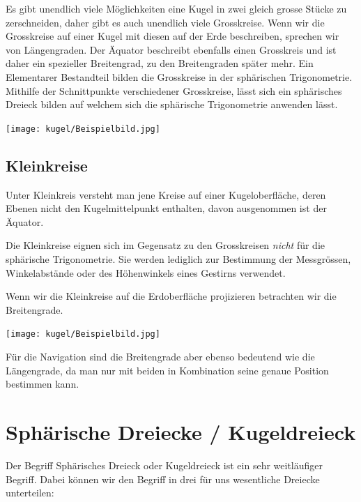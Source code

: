 \begin{refsection}
Es gibt unendlich viele Möglichkeiten eine Kugel in zwei gleich grosse Stücke zu zerschneiden, 
daher gibt es auch unendlich viele Grosskreise. Wenn wir die Grosskreise auf einer Kugel mit diesen auf der Erde beschreiben, sprechen wir von Längengraden. Der Äquator beschreibt ebenfalls einen Grosskreis und ist daher ein spezieller Breitengrad, zu den Breitengraden später mehr.
Ein Elementarer Bestandteil bilden die Grosskreise in der sphärischen Trigonometrie. Mithilfe der Schnittpunkte verschiedener Grosskreise, lässt sich ein sphärisches Dreieck bilden auf welchem sich die sphärische Trigonometrie anwenden lässt.

\begin{center}
        \texttt{[image: kugel/Beispielbild.jpg]}
\end{center}

\subsection{Kleinkreise}

\begin{definition}
Unter Kleinkreis versteht man jene Kreise auf einer Kugeloberfläche, deren Ebenen nicht den Kugelmittelpunkt enthalten, davon ausgenommen ist der Äquator.
\end{definition}

Die Kleinkreise eignen sich im Gegensatz zu den Grosskreisen \textit{nicht} für die sphärische Trigonometrie. 
Sie werden lediglich zur Bestimmung der Messgrössen, Winkelabstände oder des Höhenwinkels eines Gestirns verwendet. 

Wenn wir die Kleinkreise auf die Erdoberfläche projizieren betrachten wir die Breitengrade.

\begin{center}
        \texttt{[image: kugel/Beispielbild.jpg]}
\end{center}

Für die Navigation sind die Breitengrade aber ebenso bedeutend wie die Längengrade, da man nur mit beiden in Kombination seine genaue Position bestimmen kann.

\section{Sphärische Dreiecke / Kugeldreieck}

Der Begriff Sphärisches Dreieck oder Kugeldreieck ist ein sehr weitläufiger Begriff. 
Dabei können wir den Begriff in drei für uns wesentliche Dreiecke unterteilen:\\


\end{refsection}
